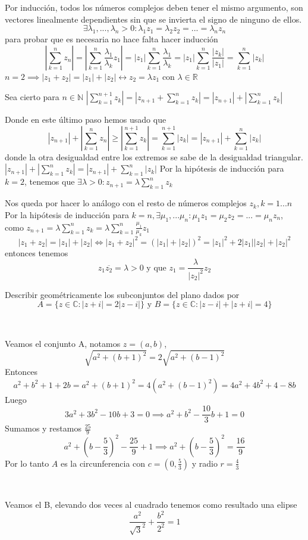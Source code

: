 \begin{sol}



Por inducción, todos los números complejos deben tener el mismo argumento, son vectores linealmente dependientes sin que se invierta el signo de ninguno de ellos.
$$\exists\lambda_1,...,\lambda_n>0 : \lambda_1 z_1 = \lambda_2 z_2 = ... = \lambda_n z_n$$
para probar que es necesaria no hace falta hacer inducción
$$ \left|\sum_{k=1}^n z_n\right| 
=
\left|\sum_{k=1}^n \frac{\lambda_1}{\lambda_k} z_1\right| 
=
|z_1|\sum_{k=1}^n \frac{\lambda_1}{\lambda_k} 
=
|z_1|\sum_{k=1}^n \frac{|z_k|}{|z_1|} 
=
\sum_{k=1}^n |z_k|$$
$n=2 \implies |z_1+z_2| = |z_1| + |z_2| \longleftrightarrow z_2 = \lambda z_1$ con $\lambda \in \mathbb{R}$

Sea cierto para $n\in\mathbb{N}$
$|\sum_{k=1}^{n+1} z_k| 
=
|z_{n+1} + \sum_{k=1}^n z_k|
=
|z_{n+1}| + |\sum_{k=1}^n z_k|$

Donde en este último paso hemos usado que
$$|z_{n+1}|+\left|\sum_{k=1}^nz_n\right| 
\geq 
\left|\sum_{k=1}^{n+1} z_k\right|=\sum_{k=1}^{n+1} |z_k| = |z_{n+1}| + \sum_{k=1}^n |z_k|$$
donde la otra desigualdad entre los extremos se sabe de la desigualdad triangular.
$|z_{n+1}| + |\sum_{k=1}^n z_k| 
=
|z_{n+1}| + \sum_{k=1}^n |z_k|$
Por la hipótesis de inducción para $k=2$, tenemos que 
$\exists \lambda >0 : z_{n+1} = \lambda \sum_{k=1}^n z_k$

Nos queda por hacer lo análogo con el resto de números complejos $z_k,k=1...n$
Por la hipótesis de inducción para $k=n, \exists \mu_1,...\mu_n : \mu_1 z_1 = \mu_2 z_2=...= \mu_n z_n$,
como $z_{n+1} = \lambda \sum_{k=1}^n z_k 
=
\lambda \sum_{k=1}^n \frac{\mu_1}{\mu_k} z_1$
$$ |z_1+z_2| = |z_1|+|z_2| 
\Longleftrightarrow
|z_1+z_2|^2 = (|z_1|+|z_2|)^2 
=
|z_1|^2 + 2|z_1||z_2|+|z_2|^2$$
 entonces tenemos
$$z_1 \overline{z_2}=\lambda>0 \text{ y que } z_1 = \frac{\lambda}{|z_2|^2 }z_2 
$$

\end{sol}

\begin{ejer}
	Describir geométricamente los subconjuntos del plano dados por
	$$ A=\{ z\in\mathbb{C} : |z+i|=2|z-i| \} \text{ y } B=\{ z\in\mathbb{C} : |z-i| + |z+i| = 4 \} $$
\end{ejer}

\begin{sol}

\

Veamos el conjunto A, notamos $z=(a,b)$,
$$ \sqrt{a^2+(b+1)^2} = 2\sqrt{a^2+(b-1)^2}$$
Entonces $$a^2+b^2+1+2 b = a^2+(b+1)^2 = 4(a^2+(b-1)^2) = 4a^2+4b^2+4-8b$$
Luego
$$3a^2+3b^2-10b+3=0 \implies a^2+b^2-\frac{10}{3}b+1=0$$
Sumamos y restamos $\frac{25}{9}$
$$a^2+(b-\frac{5}{3})^2-\frac{25}{9}+1 \implies a^2+(b-\frac{5}{3})^2=\frac{16}{9}$$
Por lo tanto $A$ es la circunferencia con $c=(0, \frac{5}{3})$ y radio $r=\frac{4}{3}$

\

Veamos el B, elevando dos veces al cuadrado tenemos como resultado una elipse
$$ \frac{a^2}{\sqrt{3}^2} + \frac{b^2}{2^2} = 1 $$
\end{sol}



